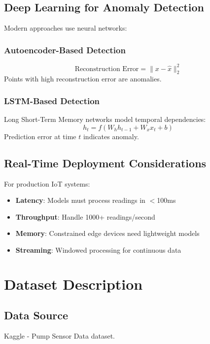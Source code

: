 \documentclass[12pt,a4paper]{report}
\begin{document}
\section{Deep Learning for Anomaly Detection}
\label{sec:deep_learning}
Modern approaches use neural networks:

\subsection{Autoencoder-Based Detection}
\begin{equation}
\text{Reconstruction Error} = \|x - \hat{x}\|_2^2
\end{equation}
Points with high reconstruction error are anomalies.

\subsection{LSTM-Based Detection}
Long Short-Term Memory networks model temporal dependencies:
\begin{equation}
h_t = f(W_h h_{t-1} + W_x x_t + b)
\end{equation}
Prediction error at time $t$ indicates anomaly.

\section{Real-Time Deployment Considerations}
\label{sec:deployment}
For production IoT systems:
\begin{itemize}
    \item \textbf{Latency}: Models must process readings in $<$100ms
    \item \textbf{Throughput}: Handle 1000+ readings/second
    \item \textbf{Memory}: Constrained edge devices need lightweight models
    \item \textbf{Streaming}: Windowed processing for continuous data
\end{itemize}

\chapter{Dataset Description}

\section{Data Source}
Kaggle - Pump Sensor Data dataset.
\end{document}

